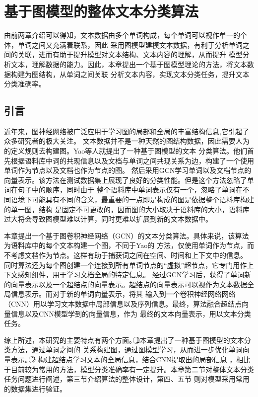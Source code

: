 \chapter{基于图模型的整体文本分类算法}
由前两章介绍可以得知，文本数据由多个单词构成，每个单词可以视作单一的个体，单词之间又充满着联系，因此
采用图模型建模文本数据，有利于分析单词之间的关联，进而有助于提升模型对文本结构、文本内容的理解，从而提升
模型分析文本，理解数据的能力。因此，本章提出一个基于图模型理论的方法，将文本数据构建为图结构，从单词之间关联
分析文本内容，实现文本分类任务，提升文本分类准确率。
\section{引言}
近年来，图神经网络被广泛应用于学习图的局部和全局的丰富结构信息,它引起了众多研究者的极大关注。
文本数据并不是一种天然的图结构数据，因此需要人为的定义规则去构建图。Yao等人就提出了一种基于图模型的文本
分类算法。他们首先根据语料库中词的共现信息以及文档与单词之间共现关系为边，构建了一个使用单词作为节点以及文档也作为节点的图。
然后采用GCN学习单词以及文档节点的向量表示。该方法在测试数据集上展现了良好的分类性能。但是这个方法忽略了单词在句子中的顺序，同时由于
整个语料库中单词表示仅有一个，忽略了单词在不同语境下可能具有不同的含义，最重要的一点即是构成的图是依据整个语料库构建的单一图，结构
是固定不可更改的，因而图的大小取决于语料库的大小，语料库过大将会导致图模型难以计算，同时更难以扩展到新的文本数据中。

本章提出一个基于图卷积神经网络（GCN）的文本分类算法。具体来说，该算法为语料库中的每个文本构建一个图，不同于Yao的
方法，仅使用单词作为节点，而不考虑文档作为节点。这样有助于捕获词之间在空间、时间和上下文中的信息。
同时算法还为每个图创建一个连接到所有单词节点的“虚拟”超节点，它专门用作上下文感知组件，用于学习文档全局的特定信息。
经过GCN学习后，获得了单词新的向量表示以及一个超结点的向量表示。超结点的向量表示可以视作为文本数据全局信息表示。而对于新的单词向量表示，将其
输入到一个卷积神经网络网络（CNN）用以学习文本数据中局部信息以及序列信息。最终，算法融合超结点向量信息以及CNN模型学到的向量信息，作为
最终的文本向量表示，用以文本分类任务。

综上所述，本研究的主要特点有两个方面。\noindent\textcircled{1}本章提出了一种基于图模型的文本分类方法，通过单词之间的
关系构建图，通过图模型学习，从而进一步优化单词向量表示。\noindent\textcircled{2} 构建超结点学习文本的全局信息，结合CNN提取出的局部信息
，相比于目前较为常用的方法，模型分类准确率有一定提升。本章第二节对整体文本分类任务问题进行阐述，第三节介绍算法的整体设计，第四、五节
则对模型采用常用的数据集进行验证。

